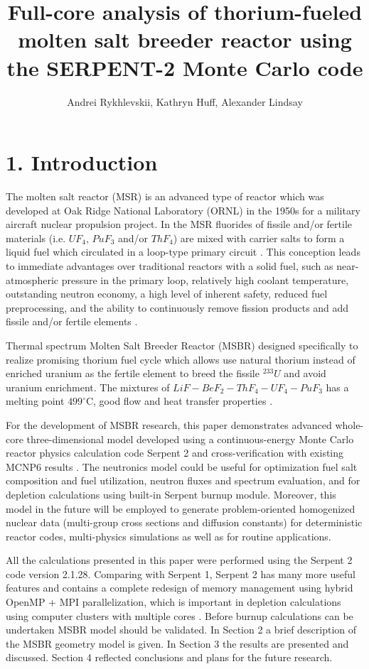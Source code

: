 \documentclass{anstrans}
\title{Full-core analysis of thorium-fueled molten salt breeder reactor using the SERPENT-2 Monte Carlo code}
\author{Andrei Rykhlevskii, Kathryn Huff, Alexander Lindsay}
\institute{
Department of Nuclear, Plasma, and Radiological Engineering, University of Illinois at Urbana-Champaign \break
Urbana, IL
}
\begin{document}
\section{1. Introduction}
The molten salt reactor (MSR) is an advanced type of reactor which was developed at Oak Ridge National Laboratory (ORNL) in the 1950s for a military aircraft nuclear propulsion project. In the MSR fluorides of fissile and/or fertile materials (i.e. $UF_4$, $PuF_3$ and/or $ThF_4$) are mixed with carrier salts to form a liquid fuel which circulated in a loop-type primary circuit \cite{haubenreich_experience_1970}. This conception leads to immediate advantages over traditional reactors with a solid fuel, such as near-atmospheric pressure in the primary loop, relatively high coolant temperature, outstanding neutron economy, a high level of inherent safety, reduced fuel preprocessing, and the ability to continuously remove fission products and add fissile and/or fertile elements \cite{leblanc_molten_2010}. 

Thermal spectrum Molten Salt Breeder Reactor (MSBR) designed specifically to realize promising thorium fuel cycle which allows use natural thorium instead of enriched uranium as the fertile element to breed the fissile $^{233}U$ and avoid uranium enrichment. The mixtures of $LiF-BeF_2-ThF_4-UF_4-PuF_3$ has a melting point $499^\circ$C, good flow and heat transfer properties \cite{robertson_conceptual_1971}.

For the development of MSBR research, this paper demonstrates advanced whole-core three-dimensional model developed using a continuous-energy Monte Carlo reactor physics calculation code Serpent 2 and cross-verification with existing MCNP6 results \cite{park_whole_2015,leppanen_serpent_2012}. The neutronics model could be useful for optimization fuel salt composition and fuel utilization, neutron fluxes and spectrum evaluation, and for depletion calculations using built-in Serpent burnup module. Moreover, this model in the future will be employed to generate problem-oriented homogenized nuclear data (multi-group cross sections and diffusion constants) for deterministic reactor codes, multi-physics simulations \cite{fridman_use_2011,valtavirta_coupled_2017} as well as for routine applications.

All the calculations presented in this paper were performed using the Serpent 2 code version 2.1.28. Comparing with Serpent 1, Serpent 2 has many more useful features and contains a complete redesign of memory management using hybrid OpenMP + MPI parallelization, which is important in depletion calculations using computer clusters with multiple cores \cite{leppanen_serpent_2015}. Before burnup calculations can be undertaken MSBR model should be validated. In Section 2 a brief description of the MSBR geometry model is given. In Section 3 the results are presented and discussed. Section 4 reflected conclusions and plans for the future research.
\end{document}
